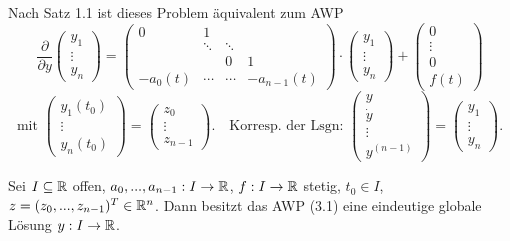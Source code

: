 \documentclass{cheat-sheet}
\begin{document}
\begin{bem}
  Nach Satz 1.1 ist dieses Problem äquivalent zum AWP
  \[
    \frac{\partial}{\partial y} \begin{pmatrix}
      y_1 \\ \vdots \\ y_n
    \end{pmatrix} = \begin{pmatrix}
      0 & 1 && \\
      & \ddots & \ddots & \\
      && 0 & 1\\
      - a_0(t) & \cdots & \cdots & -a_{n-1}(t)
    \end{pmatrix} \cdot \begin{pmatrix}
      y_1 \\ \vdots \\ y_n
    \end{pmatrix} + \begin{pmatrix}
      0 \\ \vdots \\ 0 \\ f(t)
    \end{pmatrix}
  \]
  \[
    \text{mit } \begin{pmatrix}
      y_1(t_0) \\ \vdots \\ y_n(t_0)
    \end{pmatrix} = \begin{pmatrix}
      z_0 \\ \vdots \\ z_{n-1}
    \end{pmatrix}.
    \quad \text{Korresp. der Lsgn: }
    \begin{pmatrix}
      y \\ \dot{y} \\ \vdots \\ y^{(n-1)}
    \end{pmatrix} = \begin{pmatrix}
      y_1 \\ \vdots \\ y_n
    \end{pmatrix}.
  \]
\end{bem}

\begin{satz}
  Sei $I \subseteq \mathbb{R}$ offen, $a_0, ..., a_{n-1} : I \to \mathbb{R}$, $f : I \to \mathbb{R}$ stetig, $t_0 \in I$, $z = (z_0, ..., z_{n-1})^T \in \mathbb{R}^n$. Dann besitzt das AWP (3.1) eine eindeutige globale Lösung $y : I \to \mathbb{R}$.
\end{satz}
\end{document}
